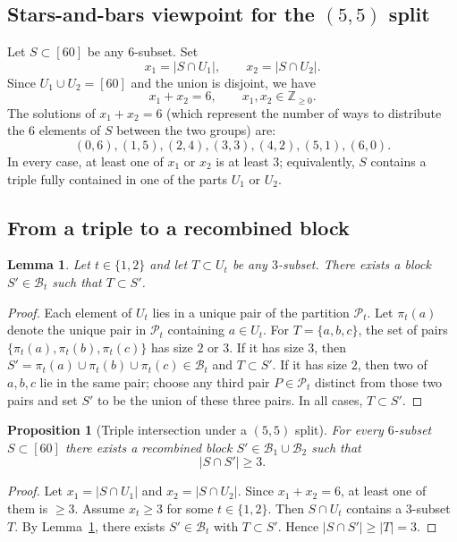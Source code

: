 \documentclass[11pt]{article}
\newtheorem{proposition}{Proposition}
\newtheorem{lemma}{Lemma}
\begin{document}
\subsection{Stars-and-bars viewpoint for the $(5,5)$ split}
Let $S\subset[60]$ be any $6$-subset. Set
\[
x_1=|S\cap U_1|,\qquad x_2=|S\cap U_2|.
\]
Since $U_1\cup U_2=[60]$ and the union is disjoint, we have
\[
x_1+x_2=6,\qquad x_1,x_2\in\mathbb{Z}_{\ge 0}.
\]
The solutions of $x_1+x_2=6$ (which represent the number of ways to distribute the $6$ elements of $S$
between the two groups) are:
\[
(0,6),(1,5),(2,4),(3,3),(4,2),(5,1),(6,0).
\]
In every case, at least one of $x_1$ or $x_2$ is at least $3$; equivalently, $S$ contains a triple
fully contained in one of the parts $U_1$ or $U_2$.

\subsection{From a triple to a recombined block}
\begin{lemma}
\label{lem:triple-to-3pairs}
Let $t\in\{1,2\}$ and let $T\subset U_t$ be any $3$-subset.
There exists a block $S'\in\mathcal{B}_t$ such that $T\subset S'$.
\end{lemma}

\begin{proof}
Each element of $U_t$ lies in a unique pair of the partition $\mathcal{P}_t$.
Let $\pi_t(a)$ denote the unique pair in $\mathcal{P}_t$ containing $a\in U_t$.
For $T=\{a,b,c\}$, the set of pairs $\{\pi_t(a),\pi_t(b),\pi_t(c)\}$ has size $2$ or $3$.
If it has size $3$, then $S'=\pi_t(a)\cup \pi_t(b)\cup \pi_t(c)\in\mathcal{B}_t$ and $T\subset S'$.
If it has size $2$, then two of $a,b,c$ lie in the same pair; choose any third pair $P\in\mathcal{P}_t$
distinct from those two pairs and set $S'$ to be the union of these three pairs. In all cases, $T\subset S'$.
\end{proof}

\begin{proposition}[Triple intersection under a $(5,5)$ split]
\label{prop:55-guarantee}
For every $6$-subset $S\subset[60]$ there exists a recombined block $S'\in\mathcal{B}_1\cup\mathcal{B}_2$
such that
\[
|S\cap S'|\ge 3.
\]
\end{proposition}

\begin{proof}
Let $x_1=|S\cap U_1|$ and $x_2=|S\cap U_2|$. Since $x_1+x_2=6$, at least one of them is $\ge 3$.
Assume $x_t\ge 3$ for some $t\in\{1,2\}$. Then $S\cap U_t$ contains a $3$-subset $T$.
By Lemma~\ref{lem:triple-to-3pairs}, there exists $S'\in\mathcal{B}_t$ with $T\subset S'$.
Hence $|S\cap S'|\ge |T|=3$.
\end{proof}
\end{document}
